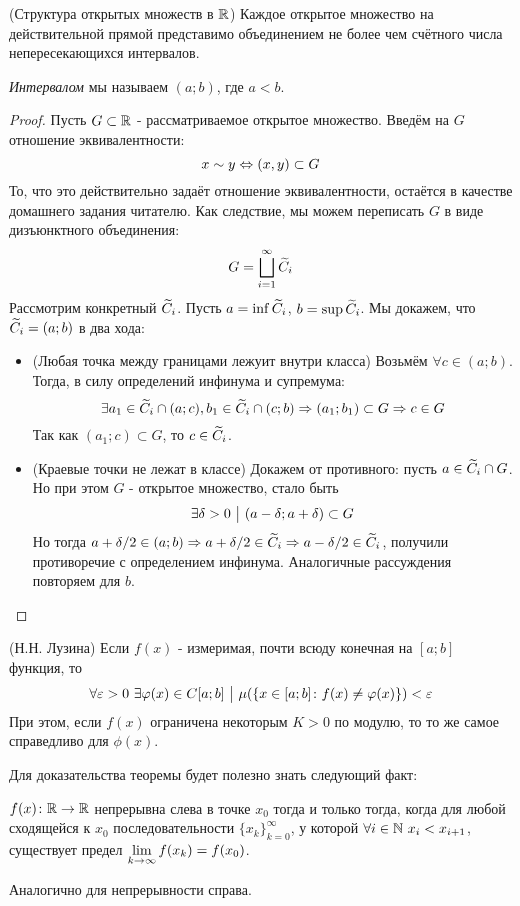 \begin{theorem} (Структура открытых множеств в $\mathbb{R}$)
	Каждое открытое множество на действительной прямой представимо объединением не более чем счётного числа непересекающихся интервалов.
\end{theorem}

\begin{reminder}
	\textit{Интервалом} мы называем $(a; b)$, где $a < b$.
\end{reminder}

\begin{proof}
	Пусть $G \subset \mathbb{R}$ - рассматриваемое открытое множество. Введём на $G$ отношение эквивалентности:
	\[
		x \sim y \Leftrightarrow (x, y) \subset G
	\]
	То, что это действительно задаёт отношение эквивалентности, остаётся в качестве домашнего задания читателю. Как следствие, мы можем переписать $G$ в виде дизъюнктного объединения:
	\[
		G = \bigsqcup_{i = 1}^\infty \widetilde{C}_i
	\]
	Рассмотрим конкретный $\widetilde{C}_i$. Пусть $a = \inf \widetilde{C}_i$, $b = \sup \widetilde{C}_i$. Мы докажем, что $\widetilde{C}_i = (a; b)$ в два хода:
	\begin{itemize}
		\item (Любая точка между границами лежуит внутри класса) Возьмём $\forall c \in (a; b)$. Тогда, в силу определений инфинума и супремума:
		\[
			\exists a_1 \in \widetilde{C}_i \cap (a; c), b_1 \in \widetilde{C}_i \cap (c; b) \Rightarrow (a_1; b_1) \subset G \Rightarrow c \in G
		\]
		Так как $(a_1; c) \subset G$, то $c \in \widetilde{C}_i$.
		
		\item (Краевые точки не лежат в классе) Докажем от противного: пусть $a \in \widetilde{C}_i \cap G$. Но при этом $G$ - открытое множество, стало быть
		\[
			\exists \delta > 0 \ \big|\  (a - \delta; a + \delta) \subset G
		\]
		Но тогда $a + \delta / 2 \in (a; b) \Rightarrow a + \delta / 2 \in \widetilde{C}_i \Rightarrow a - \delta / 2 \in \widetilde{C}_i$, получили противоречие с определением инфинума. Аналогичные рассуждения повторяем для $b$.
	\end{itemize}
\end{proof}

\begin{theorem} (Н.Н. Лузина)
	Если $f(x)$ - измеримая, почти всюду конечная на $[a; b]$ функция, то
	\[
		\forall \varepsilon > 0\ \exists \varphi(x) \in C[a; b] \ \big|\  \mu(\{x \in [a; b] \colon f(x) \neq \varphi(x)\}) < \varepsilon
	\]
	При этом, если $f(x)$ ограничена некоторым $K > 0$ по модулю, то то же самое справедливо для $\phi(x)$.
\end{theorem}

\begin{exercise}
	Для доказательства теоремы будет полезно знать следующий факт:
	
	$f(x) \colon \mathbb{R} \to \mathbb{R}$ непрерывна слева в точке $x_0$ тогда и только тогда, когда для любой сходящейся к $x_0$ последовательности $\{x_k\}_{k = 0}^\infty$, у которой $\forall i \in \mathbb{N}\ x_i < x_{i + 1}$, существует предел $\lim\limits_{k \to \infty} f(x_k) = f(x_0)$.
	
	Аналогично для непрерывности справа.
\end{exercise}

